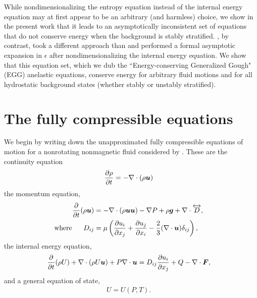 \documentclass[12pt]{article}
\newcommand{\vecf}{\bm{F}}
\begin{document}
	While nondimensionalizing the entropy equation instead of the internal energy equation may at first appear to be an arbitrary (and harmless) choice, we show in the present work that it leads to an asymptotically inconsistent set of equations that do not conserve energy when the background is stably stratified. \citet{Gough1969}, by contrast, took a different approach than \citet{Ogura1962} and performed a formal asymptotic expansion in $\epsilon$ after nondimensionalizing the internal energy equation. We show that this equation set, which we dub the ``Energy-conserving Generalized Gough" (EGG) anelastic equations, conserve energy for arbitrary fluid motions and for all hydrostatic background states (whether stably or unstably stratified).
	
	\section{The fully compressible equations}
	We begin by writing down the unapproximated fully compressible equations of motion for a nonrotating nonmagnetic fluid considered by \citet{Gough1969}. These are the continuity equation 
	\begin{align}\label{eq:cont}
		\frac{\partial\rho}{\partial t}=-\nabla\cdot(\rho\bm{u}) 
	\end{align}
	the momentum equation,
	\begin{subequations}\label{eq:mom}
	\begin{align}
		\frac{\partial}{\partial t}(\rho\bm{u})&=-\nabla\cdot(\rho\bm{u}\bm{u}) - \nabla P +\rho\bm{g} +\nabla\cdot \overleftrightarrow{D},\label{eq:mommain}\\
		\text{where}\ \ \ \ \  D_{ij}& = \mu\left(\frac{\partial u_i}{\partial x_j} + \frac{\partial u_j}{\partial x_i} - \frac{2}{3}(\nabla\cdot\bm{u})\delta_{ij}\right),\label{eq:momvisc}
	\end{align}
	\end{subequations}
	the internal energy equation,
	\begin{align}\label{eq:en}
		\pderiv{}{t}(\rho U) + \Div(\rho U\vecu) + P\Div\vecu = D_{ij}\pderiv{u_i}{x_j} + Q - \Div\vecf,
	\end{align}
	and a general equation of state,
	\begin{align}\label{eq:eos}
		U = U(P,T).
	\end{align}
\end{document}
